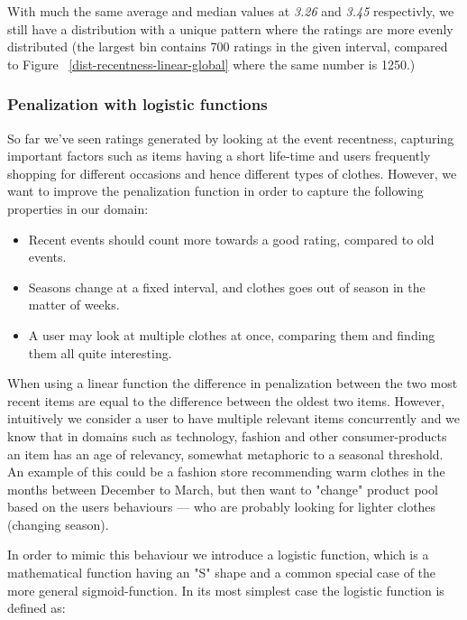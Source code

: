 With much the same average and median values at \textit{3.26} and \textit{3.45}
respectivly, we still have a distribution with a unique pattern where the
ratings are more evenly distributed (the largest bin contains 700 ratings in
the given interval, compared to Figure ~\ref{dist-recentness-linear-global}
where the same number is 1250.)

\subsubsection{Penalization with logistic functions}

So far we've seen ratings generated by looking at the event recentness,
capturing important factors such as items having a short life-time and users
frequently shopping for different occasions and hence different types of
clothes. However, we want to improve the penalization function in order to
capture the following properties in our domain:

\begin{itemize}
  \item Recent events should count more towards a good rating, compared to old
  events.
  \item Seasons change at a fixed interval, and clothes goes out of season in
  the matter of weeks.
  \item A user may look at multiple clothes at once, comparing them and finding
  them all quite interesting.
\end{itemize}

When using a linear function the difference in penalization between the two
most recent items are equal to the difference between the oldest two items.
However, intuitively we consider a user to have multiple relevant items
concurrently and we know that in domains such as technology, fashion and other
consumer-products an item has an age of relevancy, somewhat metaphoric to a
seasonal threshold. An example of this could be a fashion store recommending
warm clothes in the months between December to March, but then want to "change"
product pool based on the users behaviours --- who are probably looking for
lighter clothes (changing season).

In order to mimic this behaviour we introduce a logistic function, which is a
mathematical function having an "S" shape and a common special case of the more
general sigmoid-function. In its most simplest case the logistic function is
defined as:


